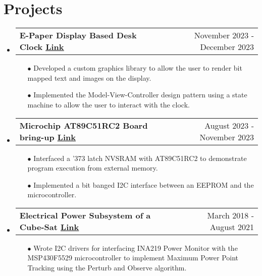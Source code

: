 \documentclass[11pt]{article}
\makeatletter
\newcommand{\resumeSubheadingP}[2]{
  \vspace{-2pt}\item
    \begin{tabular*}{1.0\textwidth}[t]{l@{\extracolsep{\fill}}r}
       \textbf{{\large #1}}&{#2} \\
    \end{tabular*}\vspace{-1pt}
}
\newcommand{\resumeSubHeadingListStart}{\begin{itemize}[leftmargin=0.0in, label={}]}
\newcommand{\resumeSubHeadingListEnd}{\end{itemize}}
\makeatother
\begin{document}
\section{Projects}
  \resumeSubHeadingListStart
    \resumeSubheadingP
    {E-Paper Display Based Desk Clock \href{https://github.com/parthkharade/Eink-DeskClock}{\small{\textbar{ }\underline{Link} }}}{November 2023 - December 2023}
    \begin{itemize}\setlength{\itemsep}{0pt}\setlength{\parskip}{0pt}\vspace{-0.2cm}
            \item[$\bullet$] Developed a custom graphics library  to allow the user to render bit mapped text and images on the display.
            \item[$\bullet$] Implemented the Model-View-Controller design pattern using a state machine to allow the user to interact with the clock.
        \end{itemize}
    \resumeSubheadingP
    {Microchip AT89C51RC2 Board bring-up \href{https://drive.google.com/drive/folders/1rbtfpOdMc_ohnfu15VS3bPxNDx-BoWwA?usp=drive_link}{\small{\textbar{ }\underline{Link}}}}{August 2023 - November 2023}
    \begin{itemize}\setlength{\itemsep}{0pt}\setlength{\parskip}{0pt}\vspace{-0.2cm}
            \item[$\bullet$] Interfaced a '373 latch NVSRAM with AT89C51RC2 to demonstrate program execution from external memory.
            \item[$\bullet$] Implemented a bit banged I2C interface between an EEPROM and the microcontroller.
        \end{itemize}
    \resumeSubheadingP
    {Electrical Power Subsystem of a Cube-Sat \href{https://github.com/parthkharade/MSP430F5529}{\small{\textbar{ }\underline{Link} }}}{March 2018 - August 2021}
    \begin{itemize}\setlength{\itemsep}{0pt}\setlength{\parskip}{0pt}\vspace{-0.2cm}
            \item[$\bullet$] Wrote I2C drivers for interfacing INA219 Power Monitor with the MSP430F5529 microcontroller to implement Maximum Power Point Tracking using the Perturb and Observe algorithm.
        \end{itemize}
    \resumeSubHeadingListEnd
\vspace{-16pt}
\end{document}
